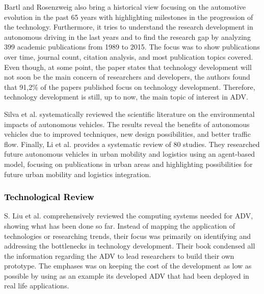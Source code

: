 \documentclass[lettersize,journal]{IEEEtran}
\begin{document}
Bartl and Rosenzweig \cite{Rosenzweig2015} also bring a historical view focusing on the automotive evolution in the past 65 years with highlighting milestones in the progression of the technology. Furthermore, it tries to understand the research development in autonomous driving in the last years and to find the research gap by analyzing 399 academic publications from 1989 to 2015. The focus was to show publications over time, journal count, citation analysis, and most publication topics covered. Even though, at some point, the paper states that technology development will not soon be the main concern of researchers and developers, the authors found that 91,2\% of the papers published focus on technology development. Therefore, technology development is still, up to now, the main topic of interest in ADV.

Silva et al. \cite{SILVA2022154615} systematically reviewed the scientific literature on the environmental impacts of autonomous vehicles. The results reveal the benefits of autonomous vehicles due to improved techniques, new design possibilities, and better traffic flow. Finally, Li et al. \cite{LI2021101686} provides a systematic review of 80 studies. They researched future autonomous vehicles in urban mobility and logistics using an agent-based model, focusing on publications in urban areas and highlighting possibilities for future urban mobility and logistics integration.


\vspace{1em}

\subsubsection {\textcolor{black}{\textbf{Technological Review}}}

\leavevmode\vspace{0.1\baselineskip}%


S. Liu et al. \cite{Liu2017} comprehensively reviewed the computing systems needed for ADV, showing what has been done so far. Instead of mapping the application of technologies or researching trends, their focus was primarily on identifying and addressing the bottlenecks in technology development. Their book \cite{liu2020} condensed all the information regarding the ADV to lead researchers to build their own prototype. The emphases was on keeping the cost of the development as low as possible by using as an example its developed ADV that had been deployed in real life applications.
\end{document}
